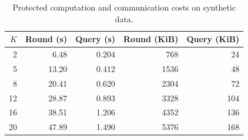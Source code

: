 \begin{table}[!t]
\centering
\caption{Protected computation and communication costs on synthetic data.}
\label{tab:ja-he-costs}
\scriptsize
\setlength{\tabcolsep}{2pt}
\begin{tabular*}{\columnwidth}{@{\extracolsep{\fill}}rrrrr@{}}
\toprule
$K$ & Round (s) & Query (s) & Round (KiB) & Query (KiB) \\
\midrule
2 & 6.48 & 0.204 & 768 & 24 \\
5 & 13.20 & 0.412 & 1536 & 48 \\
8 & 20.41 & 0.620 & 2304 & 72 \\
12 & 28.87 & 0.893 & 3328 & 104 \\
16 & 38.51 & 1.206 & 4352 & 136 \\
20 & 47.89 & 1.490 & 5376 & 168 \\
\bottomrule
\end{tabular*}
\end{table}
